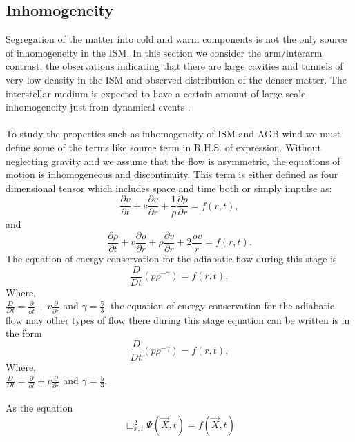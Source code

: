\documentclass[fleqn,a4paper,12pt,oneside]{article}
\begin{document}
\subsection{Inhomogeneity}
Segregation of the matter into cold and warm components is not the
only source of inhomogeneity in the ISM. In this section we
consider the arm$/$interarm contrast, the observations indicating
that there are large cavities and tunnels of very low density in
the ISM and  observed distribution of the denser matter. The
interstellar medium is expected to have a certain amount of
large-scale inhomogeneity just from dynamical events \cite{4}.
\\
\\
To study the properties such as inhomogeneity of ISM and AGB wind we must define
some of the terms like source term in R.H.S. of expression.
Without neglecting gravity and we assume that the flow is
asymmetric, the equations of motion is inhomogeneous and
discontinuity. This term is either defined as four dimensional
tensor which includes space and time both or simply impulse as:
\begin{equation}\label{1}
\frac{{\partial}{v}}{{\partial}t} +
{v}\frac{{\partial}v}{{\partial}r} +
\frac{1}{\rho}\frac{{\partial}p}{{\partial}r}= f(r, t),
\end{equation}
and
\begin{equation}\label{2}
\frac{{\partial}{\rho}}{{\partial}t} +
v\frac{{\partial}\rho}{{\partial}r}+
\rho\frac{{\partial}v}{{\partial}r}+ 2\frac{{\rho}v}{r} = f(r, t).
\end{equation}
The equation of energy conservation for the adiabatic flow during
this stage is
\begin{equation}\label{3}
\frac{D}{Dt}(p{\rho}^{-\gamma}) = f(r, t),
\end{equation}
Where,
\\ $\frac{D}{Dt} = \frac{\partial}{{\partial}t} + {v}\frac{\partial}{{\partial}r}$
and $\gamma = \frac{5}{3}$, the equation of energy conservation
for the adiabatic flow may other types of flow there during this
stage equation can be written is in the form
\begin{equation}\label{4}
\frac{ D}{Dt}(p{\rho}^{-\gamma}) = f(r,t),
\end{equation}
Where, \\
$\frac{ D}{Dt} = \frac{\partial}{{\partial}t} +
{v}\frac{\partial}{{\partial}r}$ and $\gamma = \frac{5}{3}$.\\
\\As the equation
\begin{equation}\label{1}
{\Box_{x,t}^2}\Psi(\vec{X},t) = f(\vec{X} ,t)
\end{equation}
\end{document}
